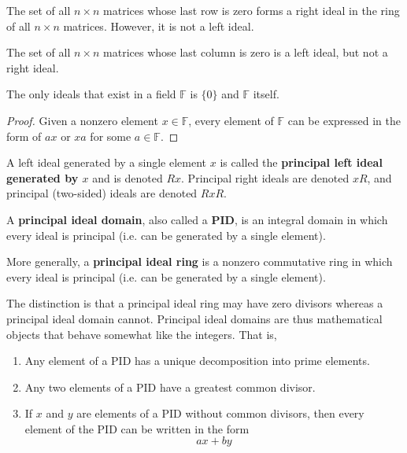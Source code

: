 \documentclass{article}
\begin{document}
    \begin{example}
      The set of all $n \times n$ matrices whose last row is zero forms a right ideal in the ring of all $n \times n$ matrices. However, it is not a left ideal.

      The set of all $n\times n$ matrices whose last column is zero is a left ideal, but not a right ideal. 
    \end{example}

    \begin{proposition}
      The only ideals that exist in a field $\mathbb{F}$ is $\{0\}$ and $\mathbb{F}$ itself. 
    \end{proposition}
    \begin{proof}
      Given a nonzero element $x \in \mathbb{F}$, every element of $\mathbb{F}$ can be expressed in the form of $a x$ or $x a$ for some $a \in \mathbb{F}$. 
    \end{proof}

    \begin{definition}
      A left ideal generated by a single element $x$ is called the \textbf{principal left ideal generated by $x$} and is denoted $R x$. Principal right ideals are denoted $x R$, and principal (two-sided) ideals are denoted $R x R$. 
    \end{definition}

    \begin{definition}
      A \textbf{principal ideal domain}, also called a \textbf{PID}, is an integral domain in which every ideal is principal (i.e. can be generated by a single element). 

      More generally, a \textbf{principal ideal ring} is a nonzero commutative ring in which every ideal is principal (i.e. can be generated by a single element). 
    \end{definition}

    The distinction is that a principal ideal ring may have zero divisors whereas a principal ideal domain cannot. Principal ideal domains are thus mathematical objects that behave somewhat like the integers. That is, 
    \begin{enumerate}
      \item Any element of a PID has a unique decomposition into prime elements. 
      \item Any two elements of a PID have a greatest common divisor. 
      \item If $x$ and $y$ are elements of a PID without common divisors, then every element of the PID can be written in the form 
        \begin{equation}
          a x + b y
        \end{equation}
    \end{enumerate}
\end{document}
